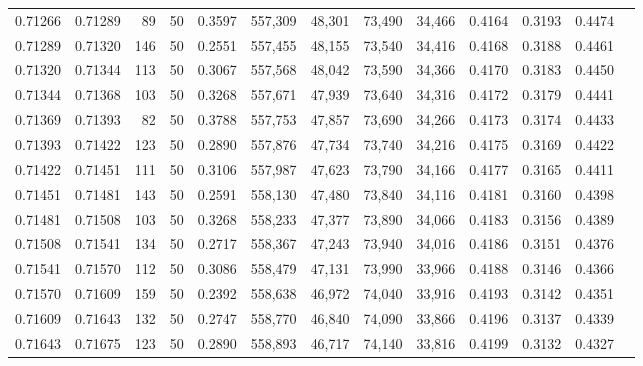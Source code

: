 \begin{tabular}{rrrrrrrrrrrrr}
0.71266 & 0.71289 &    89 &  50 &                                     0.3597 & 557,309 &  48,301 &  73,490 &  34,466 & 0.4164 & 0.3193 & 0.4474 \\
0.71289 & 0.71320 &   146 &  50 &                                     0.2551 & 557,455 &  48,155 &  73,540 &  34,416 & 0.4168 & 0.3188 & 0.4461 \\
0.71320 & 0.71344 &   113 &  50 &                                     0.3067 & 557,568 &  48,042 &  73,590 &  34,366 & 0.4170 & 0.3183 & 0.4450 \\
0.71344 & 0.71368 &   103 &  50 &                                     0.3268 & 557,671 &  47,939 &  73,640 &  34,316 & 0.4172 & 0.3179 & 0.4441 \\
0.71369 & 0.71393 &    82 &  50 &                                     0.3788 & 557,753 &  47,857 &  73,690 &  34,266 & 0.4173 & 0.3174 & 0.4433 \\
0.71393 & 0.71422 &   123 &  50 &                                     0.2890 & 557,876 &  47,734 &  73,740 &  34,216 & 0.4175 & 0.3169 & 0.4422 \\
0.71422 & 0.71451 &   111 &  50 &                                     0.3106 & 557,987 &  47,623 &  73,790 &  34,166 & 0.4177 & 0.3165 & 0.4411 \\
0.71451 & 0.71481 &   143 &  50 &                                     0.2591 & 558,130 &  47,480 &  73,840 &  34,116 & 0.4181 & 0.3160 & 0.4398 \\
0.71481 & 0.71508 &   103 &  50 &                                     0.3268 & 558,233 &  47,377 &  73,890 &  34,066 & 0.4183 & 0.3156 & 0.4389 \\
0.71508 & 0.71541 &   134 &  50 &                                     0.2717 & 558,367 &  47,243 &  73,940 &  34,016 & 0.4186 & 0.3151 & 0.4376 \\
0.71541 & 0.71570 &   112 &  50 &                                     0.3086 & 558,479 &  47,131 &  73,990 &  33,966 & 0.4188 & 0.3146 & 0.4366 \\
0.71570 & 0.71609 &   159 &  50 &                                     0.2392 & 558,638 &  46,972 &  74,040 &  33,916 & 0.4193 & 0.3142 & 0.4351 \\
0.71609 & 0.71643 &   132 &  50 &                                     0.2747 & 558,770 &  46,840 &  74,090 &  33,866 & 0.4196 & 0.3137 & 0.4339 \\
0.71643 & 0.71675 &   123 &  50 &                                     0.2890 & 558,893 &  46,717 &  74,140 &  33,816 & 0.4199 & 0.3132 & 0.4327 \\

\end{tabular}
